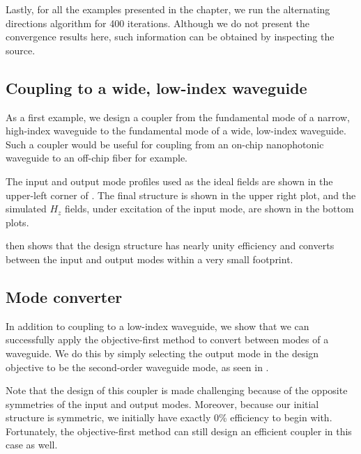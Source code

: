 Lastly, for all the examples presented in the chapter,
    we run the alternating directions algorithm for 400 iterations.
Although we do not present the convergence results here,
    such information can be obtained by inspecting the source. %

\subsection{Coupling to a wide, low-index waveguide}
As a first example, we design a coupler from 
    the fundamental mode of a narrow, high-index waveguide
    to the fundamental mode of a wide, low-index waveguide.
Such a coupler would be useful for coupling from 
    an on-chip nanophotonic waveguide to
    an off-chip fiber for example.


The input and output mode profiles used as
    the ideal fields are shown in the upper-left corner of .
The final structure is shown in the upper right plot, and
    the simulated $H_z$ fields,
    under excitation of the input mode,
    are shown in the bottom plots.

 then shows that the design structure has nearly unity efficiency
    and converts between the input and output modes
    within a very small footprint.

\subsection{Mode converter}
In addition to coupling to a low-index waveguide,
    we show that we can successfully apply the objective-first method
    to convert between modes of a waveguide.
We do this by simply selecting the output mode 
    in the design objective to be the second-order waveguide mode,
    as seen in .

Note that the design of this coupler is made challenging
    because of the opposite symmetries of the input and output modes.
Moreover, because our initial structure is symmetric,
    we initially have exactly 0\% efficiency to begin with.
Fortunately, the objective-first method can still design
    an efficient coupler in this case as well.

